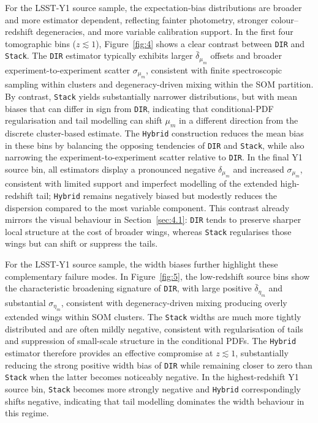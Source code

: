 For the LSST-Y1 source sample, the expectation-bias distributions are broader and more estimator dependent, reflecting fainter photometry, stronger colour--redshift degeneracies, and more variable calibration support. In the first four tomographic bins (\(z \lesssim 1\)), Figure~\ref{fig:4} shows a clear contrast between \texttt{DIR} and \texttt{Stack}. The \texttt{DIR} estimator typically exhibits larger \(\bar{\delta}_{\mu_m}\) offsets and broader experiment-to-experiment scatter \(\sigma_{\mu_m}\), consistent with finite spectroscopic sampling within clusters and degeneracy-driven mixing within the SOM partition. By contrast, \texttt{Stack} yields substantially narrower distributions, but with mean biases that can differ in sign from \texttt{DIR}, indicating that conditional-PDF regularisation and tail modelling can shift \(\mu_m\) in a different direction from the discrete cluster-based estimate. The \texttt{Hybrid} construction reduces the mean bias in these bins by balancing the opposing tendencies of \texttt{DIR} and \texttt{Stack}, while also narrowing the experiment-to-experiment scatter relative to \texttt{DIR}. In the final Y1 source bin, all estimators display a pronounced negative \(\delta_{\mu_m}\) and increased \(\sigma_{\mu_m}\), consistent with limited support and imperfect modelling of the extended high-redshift tail; \texttt{Hybrid} remains negatively biased but modestly reduces the dispersion compared to the most variable component. This contrast already mirrors the visual behaviour in Section~\ref{sec:4.1}: \texttt{DIR} tends to preserve sharper local structure at the cost of broader wings, whereas \texttt{Stack} regularises those wings but can shift or suppress the tails.

For the LSST-Y1 source sample, the width biases further highlight these complementary failure modes. In Figure~\ref{fig:5}, the low-redshift source bins show the characteristic broadening signature of \texttt{DIR}, with large positive \(\bar{\delta}_{\eta_m}\) and substantial \(\sigma_{\eta_m}\), consistent with degeneracy-driven mixing producing overly extended wings within SOM clusters. The \texttt{Stack} widths are much more tightly distributed and are often mildly negative, consistent with regularisation of tails and suppression of small-scale structure in the conditional PDFs. The \texttt{Hybrid} estimator therefore provides an effective compromise at \(z \lesssim 1\), substantially reducing the strong positive width bias of \texttt{DIR} while remaining closer to zero than \texttt{Stack} when the latter becomes noticeably negative. In the highest-redshift Y1 source bin, \texttt{Stack} becomes more strongly negative and \texttt{Hybrid} correspondingly shifts negative, indicating that tail modelling dominates the width behaviour in this regime.

